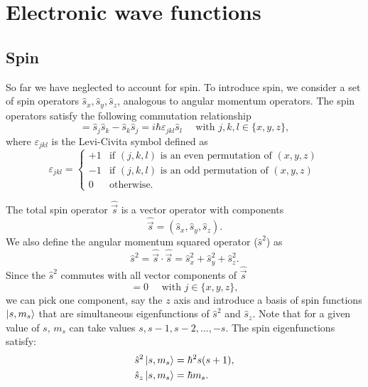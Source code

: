 \documentclass[../Main/chem532-notes.tex]{subfiles}
\begin{document}
\chapter{Electronic wave functions}

\section{Spin}
So far we have neglected to account for spin.
To introduce spin, we consider a set of spin operators $\hat{s}_x, \hat{s}_y, \hat{s}_z$, analogous to angular momentum operators.
The spin operators satisfy the following commutation relationship
\begin{equation}
[\hat{s}_{j},\hat{s}_{k}] = \hat{s}_{j}\hat{s}_{k} - \hat{s}_{k}\hat{s}_{j}= i \hbar \varepsilon_{jkl} \hat{s}_{l} \quad \text{ with } j,k,l \in \{x,y,z\},
\end{equation}
where $\varepsilon_{jkl}$ is the Levi-Civita symbol defined as
\begin{equation}
\varepsilon_{jkl} = \begin{cases}
+1 & \text{if $(j,k,l)$ is an even permutation of $(x,y,z)$} \\
-1 & \text{if $(j,k,l)$ is an odd permutation of $(x,y,z)$} \\
0 & \text{otherwise}.
\end{cases}
\end{equation}

The total spin operator $\hat{\vec{s}}$ is a vector operator with components
\begin{equation}
\hat{\vec{s}} = (\hat{s}_x, \hat{s}_y, \hat{s}_z).
\end{equation}
We also define the angular momentum squared operator ($\hat{s}^2$) as
\begin{equation}
\hat{s}^2 = \hat{\vec{s}} \cdot \hat{\vec{s}} = \hat{s}_x^2 + \hat{s}_y^2 + \hat{s}_z^2.
\end{equation}
Since the $\hat{s}^2$ commutes with all vector components of $\hat{\vec{s}}$
\begin{equation}
[\hat{s}^2,\hat{s}_j] = 0 \quad \text{ with } j \in \{x,y,z\},
\end{equation}
we can pick one component, say the $z$ axis and introduce a basis of spin functions $\ket{s,m_s}$ that are simultaneous eigenfunctions of $\hat{s}^2$ and $\hat{s}_z$. Note that for a given value of $s$, $m_s$ can take values $s, s -1, s-2, \ldots, -s$.
The spin eigenfunctions satisfy:
\begin{align}
\hat{s}^2 \ket{s,m_s} &= \hbar^2 s(s+1), \\
\hat{s}_z \ket{s,m_s} &= \hbar m_s.
\end{align}
\end{document}
